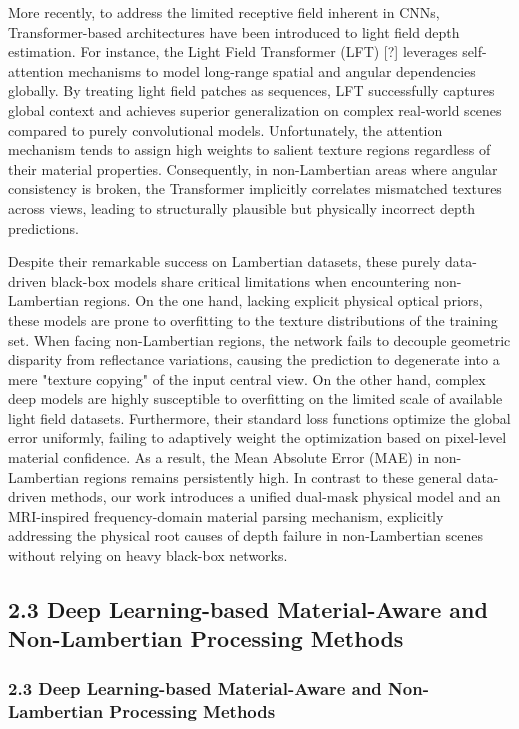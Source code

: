 More recently, to address the limited receptive field inherent in CNNs, Transformer-based architectures have been introduced to light field depth estimation. For instance, the Light Field Transformer (LFT) [?] leverages self-attention mechanisms to model long-range spatial and angular dependencies globally. By treating light field patches as sequences, LFT successfully captures global context and achieves superior generalization on complex real-world scenes compared to purely convolutional models. Unfortunately, the attention mechanism tends to assign high weights to salient texture regions regardless of their material properties. Consequently, in non-Lambertian areas where angular consistency is broken, the Transformer implicitly correlates mismatched textures across views, leading to structurally plausible but physically incorrect depth predictions.

Despite their remarkable success on Lambertian datasets, these purely data-driven black-box models share critical limitations when encountering non-Lambertian regions. On the one hand, lacking explicit physical optical priors, these models are prone to overfitting to the texture distributions of the training set. When facing non-Lambertian regions, the network fails to decouple geometric disparity from reflectance variations, causing the prediction to degenerate into a mere "texture copying" of the input central view. On the other hand, complex deep models are highly susceptible to overfitting on the limited scale of available light field datasets. Furthermore, their standard loss functions optimize the global error uniformly, failing to adaptively weight the optimization based on pixel-level material confidence. As a result, the Mean Absolute Error (MAE) in non-Lambertian regions remains persistently high. In contrast to these general data-driven methods, our work introduces a unified dual-mask physical model and an MRI-inspired frequency-domain material parsing mechanism, explicitly addressing the physical root causes of depth failure in non-Lambertian scenes without relying on heavy black-box networks.

\subsection{2.3 Deep Learning-based Material-Aware and Non-Lambertian Processing Methods}

\subsubsection{2.3 Deep Learning-based Material-Aware and Non-Lambertian Processing Methods}

